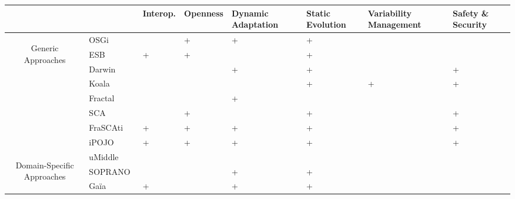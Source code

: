 \begin{table}[h!]
\begin{tabular}{cm{}|| >{\centering\arraybackslash}m{}| >{\centering\arraybackslash}m{}| >{\centering\arraybackslash}m{}| >{\centering\arraybackslash}m{}| >{\centering}m{}| >{\centering\arraybackslash}m{}|}
 & & {\tiny Interop.} & {\tiny Openness} & {\tiny Dynamic Adaptation} & {\tiny Static Evolution} & {\tiny Variability Management} & {\tiny Safety \& Security}\\
 \hline\hline
 \multirow{7}{7mm}{\begin{sideways}\parbox{25mm}{\small\centering Generic Approaches}\end{sideways}}
 &{\small OSGi~\cite{OSGI:r4}}				&  & + & + & + &  &  \\ 
 &{\small ESB~\cite{Chappell:2004}}								& + & + &  & + &  &  \\
 \cline{2-8}%
 &{\small Darwin~\cite{Georgiadis:2002}}		&  &  & + & + &   & + \\ 
 &{\small Koala~\cite{RobVanOmmering:2000}}	&  &  &   & + & + & + \\
 &{\small Fractal~\cite{Bruneton:2006}}		&  &  & + &   &   &  \\
 \cline{2-8}%
 &{\small SCA~\cite{sca:specs}}				&   & + &  & + &  & +\\
 &{\small FraSCAti~\cite{Melisson:2010}}	 	& + & + & + & + &  & + \\
 &{\small iPOJO~\cite{Escoffier:2007}}		& + & + & + & + &  & + \\
 \hline\hline
 \multirow{9}{7mm}{\begin{sideways}\parbox{30mm}{\small\centering  Domain-Specific Approaches}\end{sideways}} 
 &{\small uMiddle~\cite{Nakazawa:2007}}		&  &  &  &  &  &  \\
 &{\small SOPRANO~\cite{Wolf:2010}}			&  &  & + & + &  &  \\
 &{\small Ga\"ia~\cite{Roman:2002}}			& + &  & + & + &  &  \\

\end{tabular}
\end{table}
